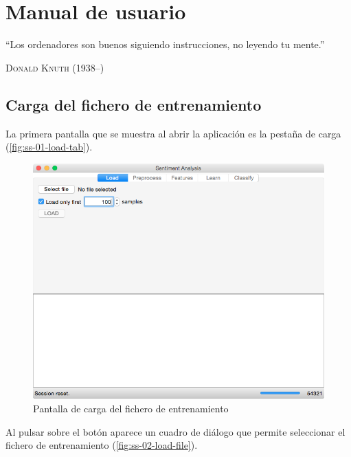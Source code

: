 \chapter{Manual de usuario}

\epigraph{``Los ordenadores son buenos siguiendo instrucciones, no leyendo tu mente.''}{\textsc{Donald Knuth} (1938--)}

\section{Carga del fichero de entrenamiento}

La primera pantalla que se muestra al abrir la aplicación es la pestaña de carga (\autoref{fig:ss-01-load-tab}).

\begin{figure}[H]
\centering
\includegraphics[width=13cm]{ss-01-load-tab}
\caption{Pantalla de carga del fichero de entrenamiento}
\label{fig:ss-01-load-tab}
\end{figure}

\newpage
Al pulsar sobre el botón  aparece un cuadro de diálogo que permite seleccionar el fichero  de entrenamiento (\autoref{fig:ss-02-load-file}).

